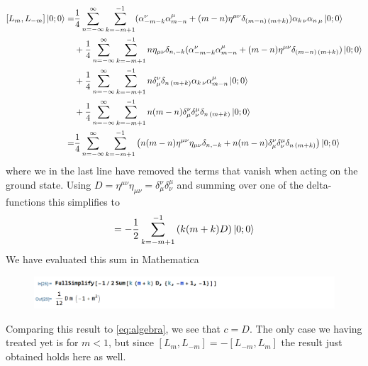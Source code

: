 \documentclass[a4paper,10pt]{article}
\renewcommand\[{\begin{equation*}}
\renewcommand\]{\end{equation*}}
\numberwithin{equation}{section}
\begin{document}
\begin{equation} \label{eq:4}
    \begin{aligned}
       [L_{m}, L_{-m}]\ket{0;0}
       =&\frac{1}{4}\sum^{\infty}_{n=-\infty}\sum_{k=-m+1}^{-1}
      (\alpha_{-m-k}^\nu \alpha_{m-n}^\mu 
       +(m-n)\eta^{\mu\nu}\delta_{(m-n)\,(m+k)}) \alpha_{k\,\nu}\alpha_{n\,\mu}\ket{0;0}
       \\
       &+\frac{1}{4}\sum^{\infty}_{n=-\infty}\sum_{k=-m+1}^{-1}
       n\eta_{\mu\nu}\delta_{n,-k} (\alpha_{-m-k}^\nu \alpha_{m-n}^\mu 
       +(m-n)\eta^{\mu\nu}\delta_{(m-n)\,(m+k)})\ket{0;0}\\
       &+\frac{1}{4}\sum^{\infty}_{n=-\infty}\sum_{k=-m+1}^{-1} n\delta^{\nu}_{\mu}\delta_{n\,(m+k)}
        \alpha_{k\,\nu} \alpha_{m-n}^\mu 
       \ket{0;0}
       \\
       &+\frac{1}{4}\sum^{\infty}_{n=-\infty}\sum_{k=-m+1}^{-1} n(m-n)\delta^{\nu}_{\mu} \delta^{\mu}_{\nu}\delta_{n\,(m+k)}
       \ket{0;0}\\
=
&\frac{1}{4}\sum^{\infty}_{n=-\infty}\sum_{k=-m+1}^{-1}
\left(n(m-n)\eta^{\mu\nu}\eta_{\mu\nu}\delta_{n,-k}+n(m-n)\delta^{\nu}_{\mu} \delta^{\mu}_{\nu}\delta_{n\,(m+k)}\right) \ket{0;0}
    \end{aligned}
\end{equation}
where we in the last line have removed the terms that vanish when acting on the ground state. Using $D=\eta^{\mu\nu}\eta_{\mu\nu}=\delta^{\nu}_{\mu}\delta_{\nu}^{\mu}$ and summing over one of the delta-functions this simplifies to
\begin{equation}
=-\frac{1}{2}\sum_{k=-m+1}^{-1}
\left(k(m+k)D\right) \ket{0;0}
\end{equation}
We have evaluated this sum in Mathematica
\begin{figure}[H]
\includegraphics[width=14cm]{cap.PNG}
\end{figure}
Comparing this result to \eqref{eq:algebra}, we see that $c=D$. The only case we having treated yet is for $m<1$, but since $[L_m,L_{-m}]=-[L_{-m},L_{m}]$ the result just obtained holds here as well.
\end{document}
